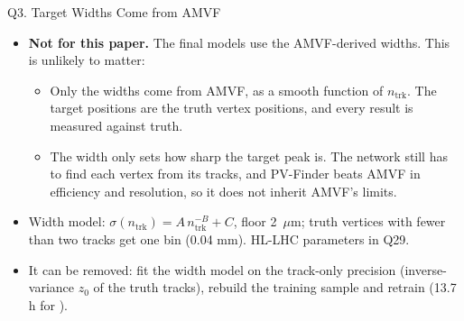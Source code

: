 \begin{frame}{Q3. Target Widths Come from AMVF}
\small
\begin{itemize}\setlength\itemsep{.4em}
\item \textbf{Not for this paper.} The final models use the AMVF-derived widths. This is unlikely to matter:
\begin{itemize}
\item Only the widths come from AMVF, as a smooth function of $n_\mathrm{trk}$. The target positions are the truth vertex positions, and every result is measured against truth.
\item The width only sets how sharp the target peak is. The network still has to find each vertex from its tracks, and PV-Finder beats AMVF in efficiency and resolution, so it does not inherit AMVF's limits.
\end{itemize}
\item Width model: $\sigma(n_\mathrm{trk})=A\,n_\mathrm{trk}^{-B}+C$, floor 2~$\mu$m; truth vertices with fewer than two tracks get one bin (0.04 mm). HL-LHC parameters in Q29.
\item It can be removed: fit the width model on the track-only precision (inverse-variance $z_0$ of the truth tracks), rebuild the training sample and retrain (13.7 h for \hlModel).
\end{itemize}
\end{frame}

